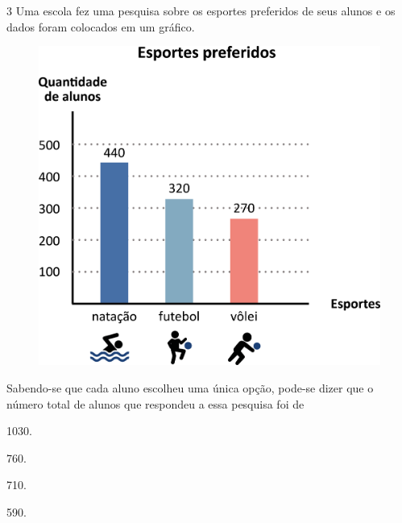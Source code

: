 \pagebreak
\num{3} Uma escola fez uma pesquisa sobre os esportes preferidos de seus alunos
e os dados foram colocados em um gráfico.

\begin{figure}[htpb!]
\centering
\includegraphics[width=\textwidth]{./media/image90.png}
\end{figure}

Sabendo-se que cada aluno escolheu uma única opção, pode-se dizer que o
número total de alunos que respondeu a essa pesquisa foi de

\begin{multicols}{2}
\begin{escolha}
\item
  1030.
\item
  760.
\item
  710.
\item
  590.
\end{escolha}
\end{multicols}

